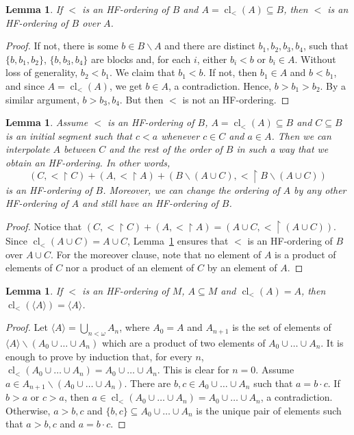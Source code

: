 \documentclass[a4paper, 11pt]{article}
\DeclareMathOperator{\cl}{cl}
\theoremstyle{note}
\newtheorem{lemma}[thm]{Lemma}
\begin{document}
\begin{lemma}\label{Feb_23_2024_7} If $<$ is an HF-ordering of $B$  and $A=\cl_<(A)\subseteq B$, then  $<$ is an HF-ordering of $B$ over $A$. 
\end{lemma}
\begin{proof}   If not, there is some $b\in B\smallsetminus A$ and there are distinct $b_1,b_2,b_3,b_4$, such that  $\{b,b_1,b_2\}$,  $\{b,b_3,b_4\}$  are  blocks and, for each $i$, either $b_i < b$ or $b_i \in A$.   Without loss of generality,  $b_2 <b_1$. We claim that $b_1 < b$.  If not, then   $b_1\in A$ and $b <b_1$,  and since $A=\cl_<(A)$, we get $b \in A$, a contradiction. Hence,  $b>b_1>b_2$. By a similar argument, $b> b_3,b_4$.  But then $<$ is not an HF-ordering.
\end{proof}

\begin{lemma}\label{June_25_2024_1.1} Assume $<$ is an HF-ordering of $B$,  $A=\cl_<(A)\subseteq B$  and  $C\subseteq B$ is an initial segment  such that  $c<a$  whenever $c\in C$ and $a\in A$. Then we can interpolate $A$ between $C$ and the rest of the order of $B$ in such a way that we obtain an HF-ordering. In other words,   $$(C, <\restriction C) +(A, <\restriction A) + (B\smallsetminus (A\cup C), <\restriction B\smallsetminus(A\cup C))$$ is an HF-ordering of $B$. Moreover, we can change the ordering
 of $A$ by any other HF-ordering of $A$ and still have an HF-ordering of $B$.
\end{lemma}
\begin{proof} Notice that $(C, <\restriction C) +(A, <\restriction A)= (A\cup C,<\restriction (A\cup C))$. Since $\cl_<(A\cup C)=A\cup C$,  Lemma~\ref{Feb_23_2024_7}  ensures that $<$ is an HF-ordering of $B$  over $A\cup C$.  For the moreover clause,  note that no element of $A$ is a product of elements of $C$  nor a product of an element of $C$ by an element of $A$.
\end{proof}


\begin{lemma}\label{order_closure}
	If $<$ is an HF-ordering of $M$,  $A\subseteq M$  and $\cl_<(A)=A$, then  $\cl_<(\langle A\rangle )= \langle A \rangle$.
\end{lemma}
\begin{proof}
	Let $\langle A\rangle = \bigcup_{n<\omega}A_n$, where $A_0=A$  and $A_{n+1}$ is the set of elements  of $\langle A\rangle\smallsetminus (A_0\cup \ldots \cup A_n)$  which are a product of two elements of $A_0\cup \ldots 	\cup A_n$.  It is enough to prove by induction that, for every $n$,   $\cl_<(A_0\cup \ldots \cup A_n)= A_0\cup\ldots\cup A_n$. This is clear for $n=0$. Assume $a\in A_{n+1}\smallsetminus (A_0\cup\ldots \cup A_n)$. There are $b,c\in A_0\cup \ldots \cup A_n$  such that $a=b\cdot c$. If $b>a$ or $c>a$, then $a\in \cl_<(A_0\cup \ldots \cup A_n)= A_0\cup \ldots \cup A_n$, a contradiction. Otherwise, $a>b,c$ and $\{b,c\}\subseteq A_0\cup\ldots\cup A_n$ is the unique pair of elements such that $a>b,c$ and $a=b\cdot c$.
\end{proof}
\end{document}

